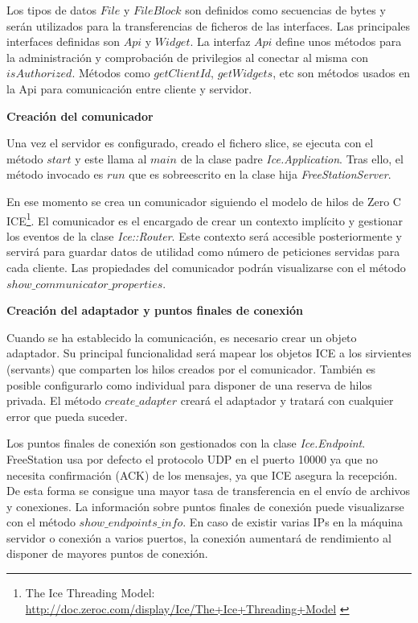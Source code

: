 Los tipos de datos $File$ y $FileBlock$ son definidos como secuencias de bytes y
serán utilizados para la transferencias de ficheros de las interfaces. Las
principales interfaces definidas son $Api$ y $Widget$. La interfaz $Api$ define
unos métodos para la administración y comprobación de privilegios al conectar al
misma con $isAuthorized$. Métodos como $getClientId$, $getWidgets$, etc son
métodos usados en la Api para comunicación entre cliente y servidor.

\newpage

\textbf{Creación del comunicador}

Una vez el servidor es configurado, creado el fichero slice, se ejecuta
con el método $start$ y este llama al $main$ de la clase padre
\emph{Ice.Application}. Tras ello, el método invocado es $run$ que es sobreescrito en
la clase hija \emph{FreeStationServer}.

En ese momento se crea un comunicador siguiendo el modelo de hilos de Zero C
ICE\footnote{The Ice Threading Model:\\
\url{http://doc.zeroc.com/display/Ice/The+Ice+Threading+Model}
\label{ftn:icethread}}. El comunicador es el encargado de crear un contexto
implícito y gestionar los eventos de la clase \emph{Ice::Router}. Este contexto
será accesible posteriormente y servirá para guardar datos de utilidad como
número de peticiones servidas para cada cliente. Las propiedades del comunicador
podrán visualizarse con el método $show\_communicator\_properties$.

\textbf{Creación del adaptador y puntos finales de conexión}

Cuando se ha establecido la comunicación, es necesario crear un objeto
adaptador. Su principal funcionalidad será mapear los objetos ICE a los
sirvientes (servants) que comparten los hilos creados por el comunicador.
También es posible configurarlo como individual para disponer de una reserva de
hilos privada. El método $create\_adapter$ creará el adaptador y tratará con
cualquier error que pueda suceder. 

Los puntos finales de conexión son gestionados con la clase \emph{Ice.Endpoint}.
FreeStation usa por defecto el protocolo UDP en el puerto 10000 ya que no
necesita confirmación (ACK) de los mensajes, ya que ICE asegura la recepción. De esta
forma se consigue una mayor tasa de transferencia en el envío de archivos y
conexiones. La información sobre puntos finales de conexión puede visualizarse
con el método $show\_endpoints\_info$. En caso de existir varias IPs en la
máquina servidor o conexión a varios puertos, la conexión aumentará de
rendimiento al disponer de mayores puntos de conexión.

